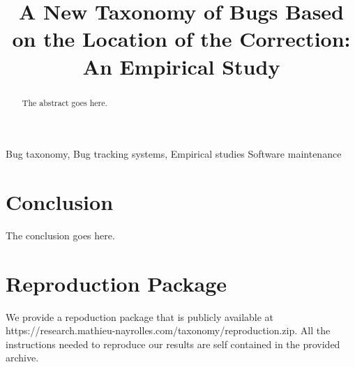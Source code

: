 \documentclass[journal]{IEEEtran}
\begin{document}
\title{A New Taxonomy of Bugs Based on the Location of the Correction: An Empirical Study}

\author{



}


\maketitle

\begin{abstract}
The abstract goes here.
\end{abstract}

\begin{IEEEkeywords}
Bug taxonomy, Bug tracking systems, Empirical studies
Software maintenance
\end{IEEEkeywords}


\IEEEpeerreviewmaketitle







\section{Conclusion}
The conclusion goes here.

\section{Reproduction Package}

We provide a repoduction package that is publicly available at https://research.mathieu-nayrolles.com/taxonomy/reproduction.zip.
All the instructions needed to reproduce our results are self contained in the provided archive.






\ifCLASSOPTIONcaptionsoff
  \newpage
\fi



\end{document}
